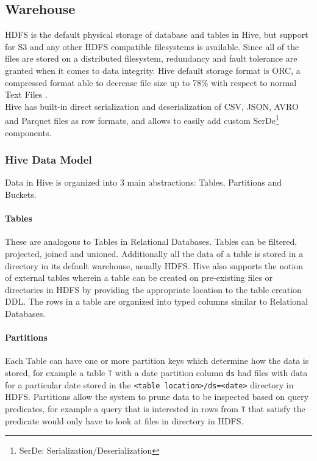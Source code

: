 \subsection{Warehouse}
HDFS is the default physical storage of database and tables in Hive, but support for S3 and any other HDFS compatible filesystems is available. Since all of the files are stored on a distributed filesystem, redundancy and fault tolerance are granted when it comes to data integrity. Hive default storage format is ORC, a compressed format able to decrease file size up to 78\% with respect to normal Text Files \cite{orc_format}.\\
Hive has built-in direct serialization and deserialization of CSV, JSON, AVRO and Parquet files as row formats, and allows to easily add custom SerDe\footnote{SerDe: Serialization/Deserialization} components.

\subsubsection{Hive Data Model}

Data in Hive is organized into 3 main abstractions: Tables, Partitions and Buckets.

\paragraph{Tables} These are analogous to Tables in Relational Databases. Tables can be filtered, projected, joined and unioned. Additionally all the data of a table is stored in a directory in its default warehouse, usually HDFS. Hive also supports the notion of external tables wherein a table can be created on pre-existing files or directories in HDFS by providing the appropriate location to the table creation DDL. The rows in a table are organized into typed columns similar to Relational Databases.
\paragraph{Partitions} Each Table can have one or more partition keys which determine how the data is stored, for example a table \texttt{T} with a date partition column \texttt{ds} had files with data for a particular date stored in the \texttt{<table location>/ds=<date>} directory in HDFS. Partitions allow the system to prune data to be inspected based on query predicates, for example a query that is interested in rows from \texttt{T} that satisfy the predicate \texttt{} would only have to look at files in \texttt{} directory in HDFS.
